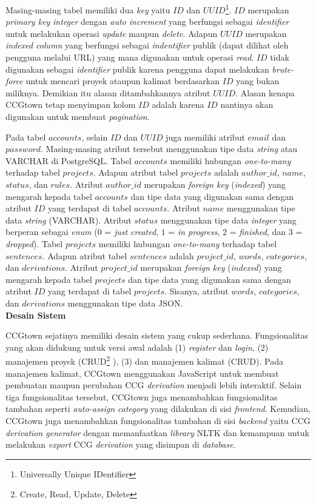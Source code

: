 Masing-masing tabel memiliki dua \textit{key} yaitu $ID$ dan
$UUID$\footnote{Universally Unique IDentifier}.
$ID$ merupakan \textit{primary key} \textit{integer} dengan \textit{auto increment}
yang berfungsi sebagai \textit{identifier} untuk melakukan operasi
\textit{update} maupun \textit{delete}.
Adapun $UUID$ merupakan \textit{indexed column} yang berfungsi sebagai
\textit{indentifier} publik (dapat dilihat oleh pengguna melalui URL)
yang mana digunakan untuk operasi \textit{read}.
$ID$ tidak digunakan sebagai \textit{identifier} publik karena pengguna dapat
melakukan \textit{brute-force} untuk mencari proyek ataupun kalimat berdasarkan
$ID$ yang bukan miliknya.
Demikian itu alasan ditambahkannya atribut $UUID$.
Alasan kenapa CCGtown tetap menyimpan kolom $ID$ adalah karena $ID$ nantinya akan
digunakan untuk membuat \textit{pagination}.

Pada tabel $accounts$, selain $ID$ dan $UUID$ juga memiliki atribut $email$ dan
$password$. Masing-masing atribut tersebut menggunakan tipe data \textit{string}
atau VARCHAR di PostgreSQL.
Tabel $accounts$ memiliki hubungan \textit{one-to-many} terhadap tabel $projects$.
Adapun atribut tabel $projects$ adalah $author\_id$, $name$, $status$, dan $rules$.
Atribut $author\_id$ merupakan \textit{foreign key} (\textit{indexed}) yang
mengarah kepada tabel $accounts$ dan tipe data yang digunakan sama dengan
atribut $ID$ yang terdapat di tabel $accounts$.
Atribut $name$ menggunakan tipe data \textit{string} (VARCHAR).
Atribut $status$ menggunakan tipe data \textit{integer} yang berperan sebagai
\textit{enum} ($0$ = \textit{just created}, $1$ = \textit{in progress},
$2$ = \textit{finished}, dan $3$ = \textit{dropped}).
Tabel $projects$ memiliki hubungan \textit{one-to-many} terhadap tabel $sentences$.
Adapun atribut tabel $sentences$ adalah $project\_id$, $words$, $categories$, dan
$derivations$. Atribut $project\_id$ merupakan \textit{foreign key}
(\textit{indexed}) yang mengarah kepada tabel $projects$ dan tipe data yang digunakan
sama dengan atribut $ID$ yang terdapat di tabel $projects$.
Sisanya, atribut $words$, $categories$, dan $derivations$ menggunakan tipe data JSON.
\\


\noindent\textbf{Desain Sistem}

CCGtown sejatinya memiliki desain sistem yang cukup sederhana.
Fungsionalitas yang akan didukung untuk versi awal adalah (1) \textit{register} dan
\textit{login}, (2) manajemen proyek (CRUD\footnote{Create, Read, Update, Delete}
), (3) dan manajemen kalimat (CRUD).
Pada manajemen kalimat, CCGtown menggunakan JavaScript untuk membuat pembuatan
maupun perubahan CCG \textit{derivation} menjadi lebih interaktif.
Selain tiga fungsionalitas tersebut, CCGtown juga menambahkan fungsionalitas tambahan
seperti \textit{auto-assign category} yang dilakukan di sisi \textit{frontend}.
Kemudian, CCGtown juga menambahkan fungsionalitas tambahan di sisi \textit{backend}
yaitu CCG \textit{derivation generator} dengan memanfaatkan \textit{library} NLTK
dan kemampuan untuk melakukan \textit{export} CCG \textit{derivation} yang disimpan
di \textit{database}.

